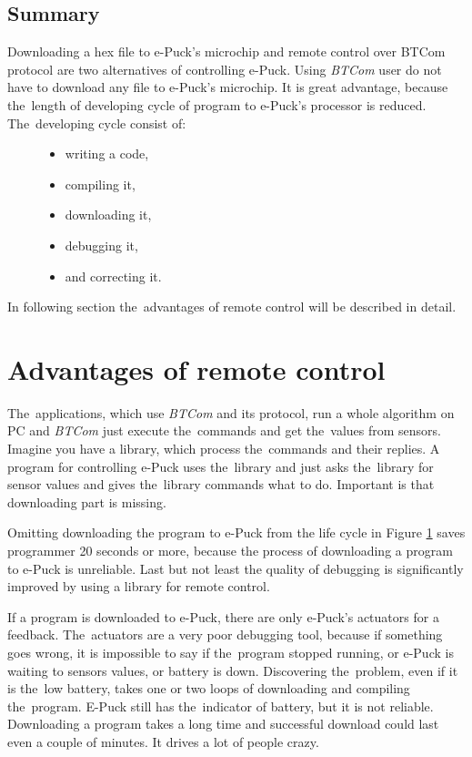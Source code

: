   \subsection*{Summary} %
  Downloading a hex file to e-Puck's microchip and remote control over BTCom protocol are two alternatives
  of controlling e-Puck.
  Using {\it BTCom} user do not have to download any file to e-Puck's microchip.
  It is great advantage, because the~length of developing cycle of program to e-Puck's processor is reduced.
  The~developing cycle consist of:
  \begin{figure}[hbp]
  \centering
  \begin{itemize}
    \item writing a code,
    \item compiling it,
    \item downloading it,
    \item debugging it,  
    \item and correcting it.
  \end{itemize}
  \label{txt:life_cycle}
  \end{figure}
  In following section the~advantages of remote control will be described in detail.

\section{Advantages of remote control} \label{sec:remote}
  The~applications, which use {\it BTCom} and its protocol, run a whole algorithm on PC and {\it BTCom} just 
  execute the~commands and get the~values from sensors. Imagine you have a library, which process the~commands
  and their replies. A program for  controlling e-Puck uses the~library and just asks the~library for sensor values and
  gives the~library commands what to do. Important is that downloading part is missing.
   
  Omitting downloading the program to e-Puck from the life cycle in Figure \ref{txt:life_cycle} saves programmer 
  20 seconds or more, because the process of downloading a program to e-Puck is unreliable.
  Last but not least the quality of debugging is significantly improved by using a library for remote control.

  If a program is downloaded to e-Puck, there are only e-Puck's actuators for a feedback.
  The~actuators are a very poor debugging tool, because if something goes wrong, 
  it is impossible to say if the~program stopped running,
  or e-Puck is waiting to sensors values, or battery is down. 
  Discovering the~problem, even if it is the~low battery, takes one or two loops of downloading and compiling the~program.
  E-Puck still has the~indicator of battery, but it is not reliable.
  Downloading a program takes a long time and successful download could last even a couple of minutes. 
  It drives a lot of people crazy.
   

